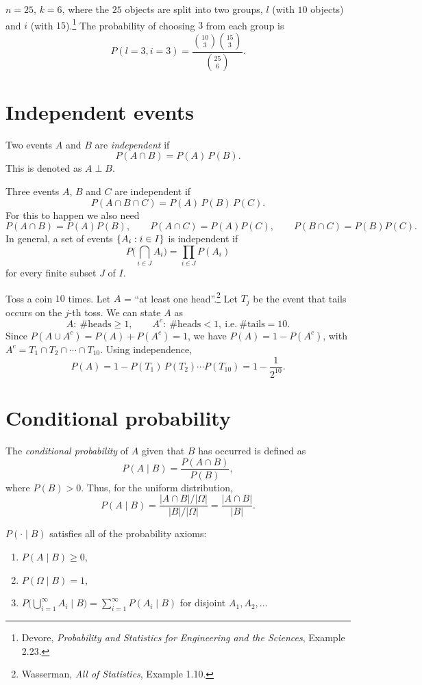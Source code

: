 \begin{example}
$n = 25$, $k = 6$, where the $25$ objects are split into two groups, $l$ (with $10$ objects) and $i$ (with $15$).\footnote{Devore, \emph{Probability and Statistics for Engineering and the Sciences}, Example 2.23.} The probability of choosing $3$ from each group is
\[
P(l = 3, i = 3) =\frac{\binom{10}{3}\binom{15}{3}}{\binom{25}{6}}.
\]
\end{example}

\section{Independent events}
Two events $A$ and $B$ are \emph{independent} if
\[
P(A \cap B) = P(A)\,P(B).
\]
This is denoted as $A \perp B$.

Three events $A$, $B$ and $C$ are independent if
\[
P(A \cap B \cap C) = P(A)\,P(B)\,P(C).
\]
For this to happen we also need
\[
P(A \cap B) = P(A)P(B), \qquad P(A \cap C) = P(A)P(C), \qquad P(B \cap C) = P(B)P(C).
\]
In general, a set of events $\left\{A_i : i \in I\right\}$ is independent if
\[
P\Big(\bigcap_{i \in J} A_i\Big) = \prod_{i \in J} P(A_i)
\]
for every finite subset $J$ of $I$.

\begin{example}
Toss a coin $10$ times. Let $A$ = ``at least one head''.\footnote{Wasserman, \emph{All of Statistics}, Example 1.10.} Let $T_j$ be the event that tails occurs on the $j$-th toss. We can state $A$ as
\[
A:\ \#\text{heads} \ge 1, \qquad A^c:\ \#\text{heads} < 1, \ \text{i.e.}\ \#\text{tails} = 10.
\]
Since $P(A \cup A^c) = P(A) + P(A^c) = 1$, we have $P(A) = 1 - P(A^c)$, with $A^c = T_1 \cap T_2 \cap \cdots \cap T_{10}$. Using independence,
\[
P(A) = 1 - P(T_1)\,P(T_2)\cdots P(T_{10}) = 1 - \frac{1}{2^{10}}.
\]
\end{example}

\section{Conditional probability}
The \emph{conditional probability} of $A$ given that $B$ has occurred is defined as
\[
P(A \mid B) = \frac{P(A \cap B)}{P(B)},
\]
where $P(B) > 0$. Thus, for the uniform distribution,
\[
P(A \mid B) = \frac{|A \cap B|/|\Omega|}{|B|/|\Omega|} = \frac{|A \cap B|}{|B|}.
\]

$P(\cdot \mid B)$ satisfies all of the probability axioms:
\begin{enumerate}[label=(\roman*)]
\item $P(A \mid B) \ge 0$,
\item $P(\Omega \mid B) = 1$,
\item $P\big(\bigcup_{i=1}^{\infty} A_i \mid B\big) = \sum_{i=1}^{\infty} P(A_i \mid B)$ for disjoint $A_1, A_2, \dots$
\end{enumerate}

